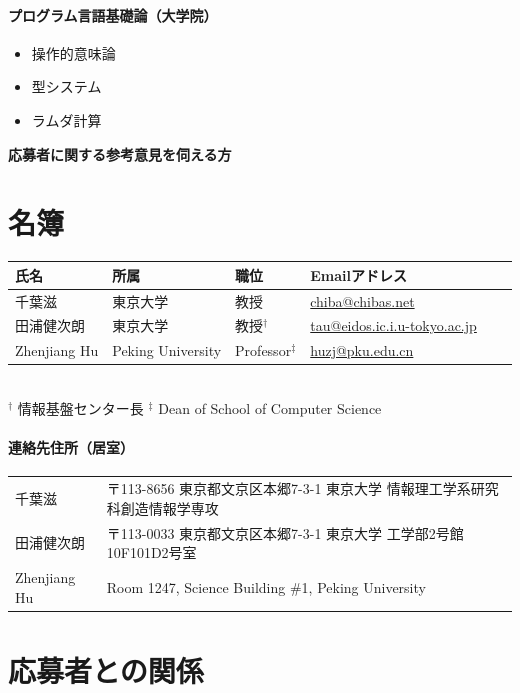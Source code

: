 \documentclass[dvipdfmx]{jsarticle}
\begin{document}
\paragraph{プログラム言語基礎論（大学院）}
\begin{itemize}
 \item 操作的意味論
 \item 型システム
 \item ラムダ計算
\end{itemize}

\newpage
\begin{center}
\LARGE\bfseries 応募者に関する参考意見を伺える方
\end{center}
\bigskip

\section*{名簿}
\begin{center}
\begin{tabular}[t]{llllll}
氏名 & 所属 & 職位 & Emailアドレス \\ \hline
千葉滋 & 東京大学 & 教授 & \url{chiba@chibas.net}  \\
田浦健次朗 & 東京大学 & 教授$^\dagger$ & \url{tau@eidos.ic.i.u-tokyo.ac.jp} \\
Zhenjiang Hu & Peking University & Professor$^\ddagger$ & \url{huzj@pku.edu.cn} \\
\end{tabular}
\medskip\\
\noindent
$^\dagger$ 情報基盤センター長
\qquad
\noindent
$^\ddagger$ Dean of School of Computer Science
\end{center}
\paragraph{連絡先住所（居室）}
\begin{center}
\begin{tabular}[t]{ll}
千葉滋 & 〒113-8656 東京都文京区本郷7-3-1 東京大学 情報理工学系研究科創造情報学専攻 \\
田浦健次朗 & 〒113-0033 東京都文京区本郷7-3-1 東京大学 工学部2号館10F101D2号室 \\
Zhenjiang Hu & Room 1247, Science Building \#1, Peking University \\
\end{tabular}
\end{center}

\section*{応募者との関係}
\end{document}
